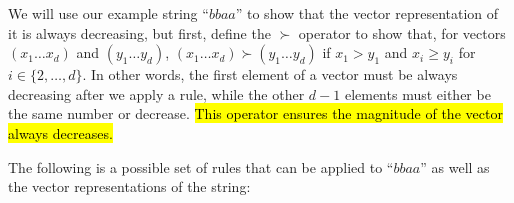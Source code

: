 We will use our example string ``$bbaa$'' to show that the vector representation of it is always decreasing, but first, define the $\succ$ operator to show that, for vectors $(x_1 \ldots x_d)$ and $(y_1 \ldots y_d)$, $(x_1 \ldots x_d) \succ (y_1 \ldots y_d)$ if $x_1 > y_1$ and $x_i \geq y_i$ for $i \in \{2, \ldots, d\}$. In other words, the first element of a vector must be always decreasing after we apply a rule, while the other $d-1$ elements must either be the same number or decrease. \hl{This operator ensures the magnitude of the vector always decreases.} \par
The following is a possible set of rules that can be applied to ``$bbaa$'' as well as the vector representations of the string: \par
